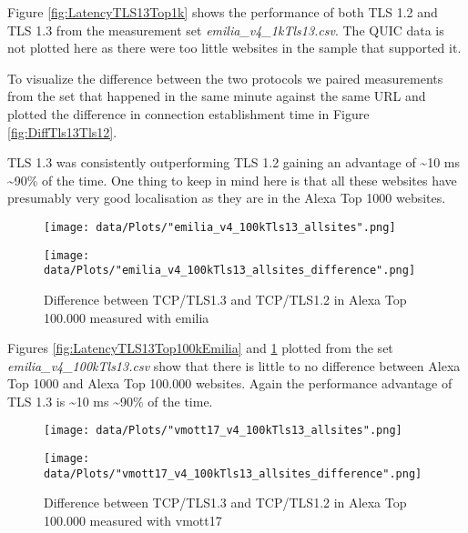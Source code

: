 Figure \ref{fig:LatencyTLS13Top1k} shows the performance of both TLS 1.2 and TLS 1.3 from the measurement set \textit{emilia\_v4\_1kTls13.csv}.
The QUIC data is not plotted here as there were too little websites in the sample that supported it.

To visualize the difference between the two protocols we paired measurements from the set that happened in the same minute against the same URL and plotted the difference in connection establishment time in Figure \ref{fig:DiffTls13Tls12}.

TLS 1.3 was consistently outperforming TLS 1.2 gaining an advantage of \textasciitilde 10 ms \textasciitilde 90\% of the time.
One thing to keep in mind here is that all these websites have presumably very good localisation as they are in the Alexa Top 1000 websites. \\

\begin{figure}[!thb]
	\centering
	\begin{minipage}{.45\textwidth}
		\centering
		\texttt{[image: data/Plots/"emilia\_v4\_100kTls13\_allsites".png]}
		\caption{Latency of 15981 sites in Alexa Top 100.000 that support TLS 1.3 measured with emilia}
  		\label{fig:LatencyTLS13Top100kEmilia}
  	\end{minipage}%
  	\hspace{0.5cm}
  	\begin{minipage}{.45\textwidth}
  		\centering
  		\texttt{[image: data/Plots/"emilia\_v4\_100kTls13\_allsites\_difference".png]}
		\caption{Difference between TCP/TLS1.3 and TCP/TLS1.2 in Alexa Top 100.000 measured with emilia}
  		\label{fig:DiffTls13Tls12Top100kEmilia}
  	\end{minipage}
\end{figure}

Figures \ref{fig:LatencyTLS13Top100kEmilia} and \ref{fig:DiffTls13Tls12Top100kEmilia} plotted from the set \textit{emilia\_v4\_100kTls13.csv} show that there is little to no difference between Alexa Top 1000 and Alexa Top 100.000 websites.
Again the performance advantage of TLS 1.3 is \textasciitilde 10 ms \textasciitilde 90\% of the time.


\begin{figure}[!thb]
	\centering
	\begin{minipage}{.45\textwidth}
		\centering
		\texttt{[image: data/Plots/"vmott17\_v4\_100kTls13\_allsites".png]}
		\caption{Latency of 15981 sites in Alexa Top 100.000 that support TLS 1.3 measured with vmott17}
  		\label{fig:LatencyTLS13Top100kVmott17}
  	\end{minipage}%
  	\hspace{0.5cm}
  	\begin{minipage}{.45\textwidth}
  		\centering
  		\texttt{[image: data/Plots/"vmott17\_v4\_100kTls13\_allsites\_difference".png]}
		\caption{Difference between TCP/TLS1.3 and TCP/TLS1.2 in Alexa Top 100.000 measured with vmott17}
  		\label{fig:DiffTls13Tls12Top100kVmott17}
  	\end{minipage}
\end{figure}

